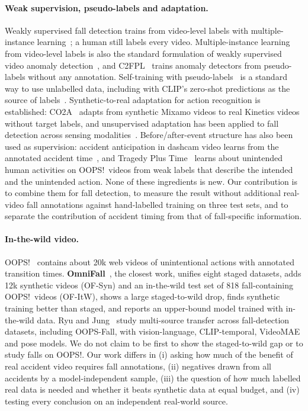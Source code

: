 \documentclass[10pt,twocolumn,letterpaper]{article}
\begin{document}
\paragraph{Weak supervision, pseudo-labels and adaptation.} Weakly supervised fall detection trains from video-level labels with multiple-instance learning~\cite{wu2023weakfall,madsen2024weakfall}; a human still labels every video. Multiple-instance learning from video-level labels is also the standard formulation of weakly supervised video anomaly detection~\cite{sultani2018anomaly}, and C2FPL~\cite{allahham2024c2fpl} trains anomaly detectors from pseudo-labels without any annotation. Self-training with pseudo-labels~\cite{xie2020noisystudent} is a standard way to use unlabelled data, including with CLIP's zero-shot predictions as the source of labels~\cite{huang2022upl}. Synthetic-to-real adaptation for action recognition is established: CO2A~\cite{dacosta2022co2a} adapts from synthetic Mixamo videos to real Kinetics videos without target labels, and unsupervised adaptation has been applied to fall detection across sensing modalities~\cite{xiao2023umafd}. Before/after-event structure has also been used as supervision: accident anticipation in dashcam video learns from the annotated accident time~\cite{chan2016dashcam}, and Tragedy Plus Time~\cite{chakravarthy2022tragedy} learns about unintended human activities on OOPS!\ videos from weak labels that describe the intended and the unintended action. None of these ingredients is new. Our contribution is to combine them for fall detection, to measure the result without additional real-video fall annotations against hand-labelled training on three test sets, and to separate the contribution of accident timing from that of fall-specific information.

\paragraph{In-the-wild video.} OOPS!~\cite{epstein2020oops} contains about 20k web videos of unintentional actions with annotated transition times. \textbf{OmniFall}~\cite{omnifall}, the closest work, unifies eight staged datasets, adds 12k synthetic videos (OF-Syn) and an in-the-wild test set of 818 fall-containing OOPS!\ videos (OF-ItW), shows a large staged-to-wild drop, finds synthetic training better than staged, and reports an upper-bound model trained with in-the-wild data. Ryu and Jung~\cite{ryu2026transfer} study multi-source transfer across fall-detection datasets, including OOPS-Fall, with vision-language, CLIP-temporal, VideoMAE and pose models. We do not claim to be first to show the staged-to-wild gap or to study falls on OOPS!. Our work differs in (i) asking how much of the benefit of real accident video requires fall annotations, (ii) negatives drawn from all accidents by a model-independent sample, (iii) the question of how much labelled real data is needed and whether it beats synthetic data at equal budget, and (iv) testing every conclusion on an independent real-world source.
\end{document}
